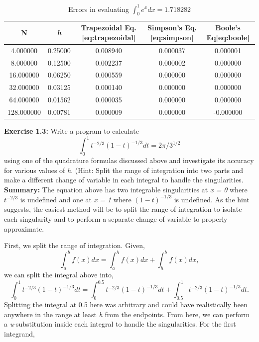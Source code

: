 \documentclass[10pt]{article}
\begin{document}
\begin{table}[!ht]
	\begin{center}
	\caption{Errors in evaluating $\int^1_0 e^x dx = 1.718282$ }
		\label{tab:quad_errors}
		\begin{tabular}{|ccccc|}
		\hline
		N & \textit{h} & Trapezoidal Eq.\ref{eq:trapezoidal} & Simpson's Eq.\ref{eq:simpson} & Boole's Eq\ref{eq:boole} \\
		\hline
		4.000000&0.25000&0.008940&0.000037&0.000001\\
		8.000000&0.12500&0.002237&0.000002&0.000000\\
		16.000000&0.06250&0.000559&0.000000&0.000000\\
		32.000000&0.03125&0.000140&0.000000&0.000000\\
		64.000000&0.01562&0.000035&0.000000&0.000000\\
		128.000000&0.00781&0.000009&0.000000&-0.000000\\
		\hline
		\end{tabular}
	\end{center}
\end{table}

\newpage\noindent
\label{exercise:1.3}\textbf{Exercise 1.3:} Write a program to calculate
\[
\int^1_0 t^{-2/3}(1-t)^{-1/3}dt=2\pi /3^{1/2}
\]
using one of the quadrature formulas discussed above and investigate its accuracy for various values of \textit{h}. (Hint: Split the range of integration into two parts and make a different change of variable in each integral to handle the singularities.\\

\noindent\textbf{Summary:} The equation above has two integrable singularities at \textit{x = 0} where $t^{-2/3}$ is undefined and one at \textit{x = 1} where $(1-t)^{-1/3}$ is undefined. As the hint suggests, the easiest method will be to split the range of integration to isolate each singularity and to perform a separate change of variable to properly approximate.

First, we split the range of integration. Given,
\[
\int^b_a f(x)dx = \int^h_a f(x)dx + \int^b_h f(x)dx,
\]
we can split the integral above into,
\begin{equation}
\int^1_0 t^{-2/3}(1-t)^{-1/3}dt=\int_0^{0.5}t^{-2/3}(1-t)^{-1/3}dt+\int_{0.5}^1t^{-2/3}(1-t)^{-1/3}dt.
\end{equation}
Splitting the integral at 0.5 here was arbitrary and could have realistically been anywhere in the range at least \textit{h} from the endpoints.
From here, we can perform a \textit{u}-substitution inside each integral to handle the singularities. For the first integrand,
\end{document}

